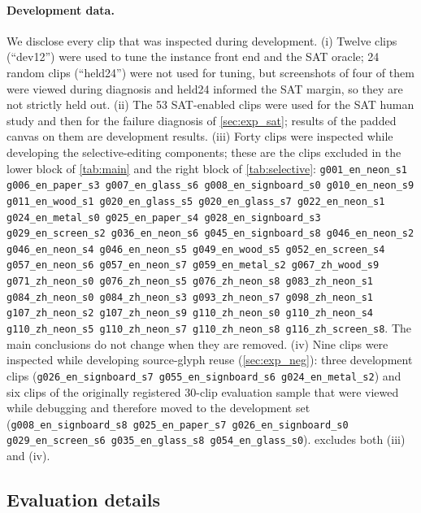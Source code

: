 \paragraph{Development data.} We disclose every clip that was inspected during development. (i) Twelve clips (``dev12'') were used to tune the instance front end and the SAT oracle; 24 random clips (``held24'') were not used for tuning, but screenshots of four of them were viewed during diagnosis and held24 informed the SAT margin, so they are not strictly held out. (ii) The 53 SAT-enabled clips were used for the SAT human study and then for the failure diagnosis of \cref{sec:exp_sat}; results of the padded canvas on them are development results. (iii) Forty clips were inspected while developing the selective-editing components; these are the clips excluded in the lower block of \cref{tab:main} and the right block of \cref{tab:selective}:
{\scriptsize\texttt{g001\_en\_neon\_s1 g006\_en\_paper\_s3 g007\_en\_glass\_s6 g008\_en\_signboard\_s0 g010\_en\_neon\_s9 g011\_en\_wood\_s1 g020\_en\_glass\_s5 g020\_en\_glass\_s7 g022\_en\_neon\_s1 g024\_en\_metal\_s0 g025\_en\_paper\_s4 g028\_en\_signboard\_s3 g029\_en\_screen\_s2 g036\_en\_neon\_s6 g045\_en\_signboard\_s8 g046\_en\_neon\_s2 g046\_en\_neon\_s4 g046\_en\_neon\_s5 g049\_en\_wood\_s5 g052\_en\_screen\_s4 g057\_en\_neon\_s6 g057\_en\_neon\_s7 g059\_en\_metal\_s2 g067\_zh\_wood\_s9 g071\_zh\_neon\_s0 g076\_zh\_neon\_s5 g076\_zh\_neon\_s8 g083\_zh\_neon\_s1 g084\_zh\_neon\_s0 g084\_zh\_neon\_s3 g093\_zh\_neon\_s7 g098\_zh\_neon\_s1 g107\_zh\_neon\_s2 g107\_zh\_neon\_s9 g110\_zh\_neon\_s0 g110\_zh\_neon\_s4 g110\_zh\_neon\_s5 g110\_zh\_neon\_s7 g110\_zh\_neon\_s8 g116\_zh\_screen\_s8}.} The main conclusions do not change when they are removed. (iv) Nine clips were inspected while developing source-glyph reuse (\cref{sec:exp_neg}): three development clips ({\scriptsize\texttt{g026\_en\_signboard\_s7 g055\_en\_signboard\_s6 g024\_en\_metal\_s2}}) and six clips of the originally registered 30-clip evaluation sample that were viewed while debugging and therefore moved to the development set ({\scriptsize\texttt{g008\_en\_signboard\_s8 g025\_en\_paper\_s7 g026\_en\_signboard\_s0 g029\_en\_screen\_s6 g035\_en\_glass\_s8 g054\_en\_glass\_s0}}).  excludes both (iii) and (iv).

\subsection{Evaluation details}
\label{sec:supp_eval}

